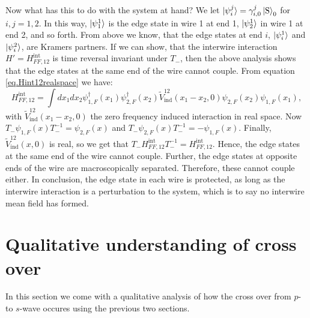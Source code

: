 Now what has this to do with the system at hand? We let $\ket{\psi_{i}^{j}} = \gamma_{i,0}^{j}\ket{\text{S}}_0$ for $i, j = 1, 2$. In this way, $\ket{\psi_{1}^1}$ is the edge state in wire 1 at end 1, $\ket{\psi_{2}^1}$ in wire 1 at end 2, and so forth. From above we know, that the edge states at end $i$, $\ket{\psi_{i}^1}$ and $\ket{\psi_{i}^2}$, are Kramers partners. If we can show, that the interwire interaction $H' = H^\text{int}_{FF,12}$ is time reversal invariant under $T_-$, then the above analysis shows that the edge states at the same end of the wire cannot couple. From equation \eqref{eq.Hint12realspace} we have:
\begin{equation}
H^\text{int}_{FF,12} = \int dx_1 dx_2 \psi^\dagger_{1,F}(x_1)\psi^\dagger_{2,F}(x_2) \tilde{V}_{\text{ind}}^{12}(x_1-x_2,0) \psi_{2,F}(x_2)\psi_{1,F}(x_1),
\end{equation}
with $\tilde{V}_{\text{ind}}^{12}(x_1-x_2,0)$ the zero frequency induced interaction in real space. Now $T_-\psi_{1,F}(x)T^{-1}_- = \psi_{2,F}(x)$ and $T_-\psi_{2,F}(x)T^{-1}_- = -\psi_{1,F}(x)$. Finally, $\tilde{V}_{\text{ind}}^{12}(x, 0)$ is real, so we get that $T_-H^\text{int}_{FF,12}T_-^{-1} = H^\text{int}_{FF,12}$. Hence, the edge states at the same end of the wire cannot couple. Further, the edge states at opposite ends of the wire are macroscopically separated. Therefore, these cannot couple either. In conclusion, the edge state in each wire is protected, as long as the interwire interaction is a perturbation to the system, which is to say no interwire mean field has formed.  

\section{Qualitative understanding of cross over}
\label{sec.2wirestransitionqualitative}
In this section we come with a qualitative analysis of how the cross over from $p$- to $s$-wave occures using the previous two sections. 

